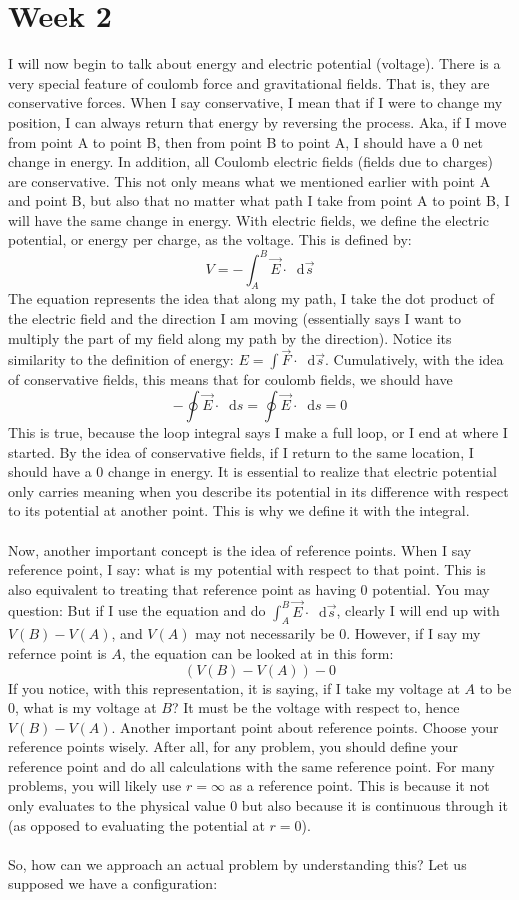\documentclass{article}
\newcommand*\dif{\mathop{}\!\mathrm{d}}
\begin{document}
\section{Week 2}
I will now begin to talk about energy and electric potential (voltage). There is a very special feature of coulomb force and gravitational fields. That is, they are conservative forces. When I say conservative, I mean that if I were to change my position, I can always return that energy by reversing the process. Aka, if I move from point A to point B, then from point B to point A, I should have a $0$ net change in energy. In addition, all Coulomb electric fields (fields due to charges) are conservative. This not only means what we mentioned earlier with point A and point B, but also that no matter what path I take from point A to point B, I will have the same change in energy. With electric fields, we define the electric potential, or energy per charge, as the voltage. This is defined by: $$V = -\int_A^B \vec{E} \cdot \dif \vec{s}$$The equation represents the idea that along my path, I take the dot product of the electric field and the direction I am moving (essentially says I want to multiply the part of my field along my path by the direction). Notice its similarity to the definition of energy: $E = \int \vec{F} \cdot \dif \vec{s}$. Cumulatively, with the idea of conservative fields, this means that for coulomb fields, we should have $$-\oint \vec{E} \cdot \dif s = \oint \vec{E} \cdot \dif s = 0$$This is true, because the loop integral says I make a full loop, or I end at where I started. By the idea of conservative fields, if I return to the same location, I should have a $0$ change in energy. It is essential to realize that electric potential only carries meaning when you describe its potential in its difference with respect to its potential at another point. This is why we define it with the integral. \\
\\
Now, another important concept is the idea of reference points. When I say reference point, I say: what is my potential with respect to that point. This is also equivalent to treating that reference point as having 0 potential. You may question: But if I use the equation and do $\int_A^B \vec{E} \cdot \dif \vec{s}$, clearly I will end up with $V(B) - V(A)$, and $V(A)$ may not necessarily be 0. However, if I say my refernce point is $A$, the equation can be looked at in this form: $$(V(B)-V(A)) - 0$$If you notice, with this representation, it is saying, if I take my voltage at $A$ to be 0, what is my voltage at $B$? It must be the voltage with respect to, hence $V(B)- V(A)$. Another important point about reference points. Choose your reference points wisely. After all, for any problem, you should define your reference point and do all calculations with the same reference point. For many problems, you will likely use $r = \infty$ as a reference point. This is because it not only evaluates to the physical value $0$ but also because it is continuous through it (as opposed to evaluating the potential at $r = 0$).\\
\\
So, how can we approach an actual problem by understanding this? Let us supposed we have a configuration: 
\end{document}
